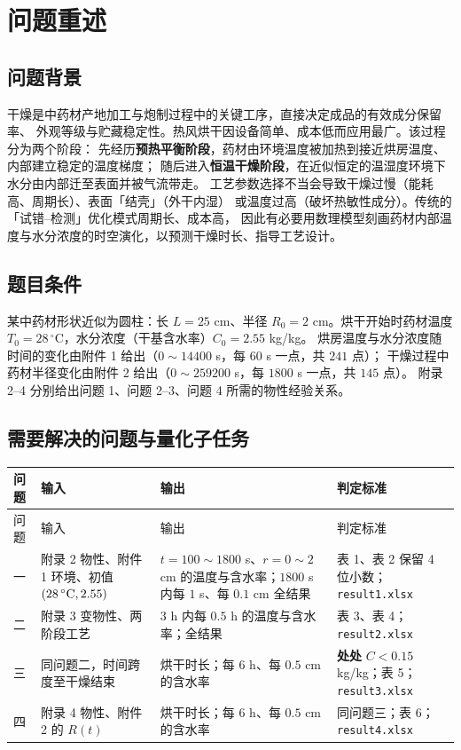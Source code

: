 \documentclass[withoutpreface,bwprint]{cumcmthesis}
\begin{document}
\section{问题重述}

\subsection{问题背景}

干燥是中药材产地加工与炮制过程中的关键工序，直接决定成品的有效成分保留率、
外观等级与贮藏稳定性。热风烘干因设备简单、成本低而应用最广。该过程分为两个阶段：
先经历\textbf{预热平衡阶段}，药材由环境温度被加热到接近烘房温度、内部建立稳定的温度梯度；
随后进入\textbf{恒温干燥阶段}，在近似恒定的温湿度环境下水分由内部迁至表面并被气流带走。
工艺参数选择不当会导致干燥过慢（能耗高、周期长）、表面「结壳」（外干内湿）
或温度过高（破坏热敏性成分）。传统的「试错--检测」优化模式周期长、成本高，
因此有必要用数理模型刻画药材内部温度与水分浓度的时空演化，以预测干燥时长、指导工艺设计。

\subsection{题目条件}

某中药材形状近似为圆柱：长 $L=25$ cm、半径 $R_0=2$ cm。烘干开始时药材温度
$T_0=28\,^\circ$C，水分浓度（干基含水率）$C_0=2.55$ kg/kg。
烘房温度与水分浓度随时间的变化由附件 1 给出（$0\sim14400$ s，每 $60$ s 一点，共 $241$ 点）；
干燥过程中药材半径变化由附件 2 给出（$0\sim259200$ s，每 $1800$ s 一点，共 $145$ 点）。
附录 2--4 分别给出问题 1、问题 2--3、问题 4 所需的物性经验关系。

\subsection{需要解决的问题与量化子任务}

\begin{longtable}{@{}p{1.5cm}p{4.6cm}p{4.4cm}p{4.6cm}@{}}
\toprule
问题 & 输入 & 输出 & 判定标准 \\
\midrule
\endfirsthead
\toprule
问题 & 输入 & 输出 & 判定标准 \\
\midrule
\endhead
一 & 附录 2 物性、附件 1 环境、初值 $(28\,^\circ{\rm C},2.55)$ &
$t=100\sim1800$ s、$r=0\sim2$ cm 的温度与含水率；$1800$ s 内每 $1$ s、每 $0.1$ cm 全结果 &
表 1、表 2 保留 4 位小数；\texttt{result1.xlsx} \\
二 & 附录 3 变物性、两阶段工艺 & $3$ h 内每 $0.5$ h 的温度与含水率；全结果 &
表 3、表 4；\texttt{result2.xlsx} \\
三 & 同问题二，时间跨度至干燥结束 & 烘干时长；每 $6$ h、每 $0.5$ cm 的含水率 &
\textbf{处处} $C<0.15$ kg/kg；表 5；\texttt{result3.xlsx} \\
四 & 附录 4 物性、附件 2 的 $R(t)$ & 烘干时长；每 $6$ h、每 $0.5$ cm 的含水率 &
同问题三；表 6；\texttt{result4.xlsx} \\
\bottomrule
\end{longtable}
\end{document}
